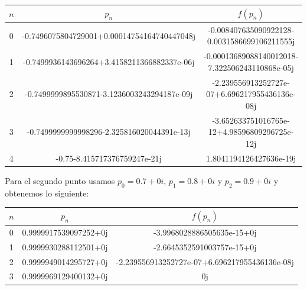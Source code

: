 \documentclass{article}
\begin{document}
\begin{center}
    \begin{tabular}{||c c c||} 
    \hline
    $n$ & $p_{n}$ & $f(p_n)$ \\ [0.5ex] 
    \hline
    0 & -0.7496075804729001+0.00014754164740447048j & -0.008407635090922128-0.0031586699106211555j\\
    \hline
    1 & -0.7499936143696264+3.4158211366882337e-06j & -0.00013689088140012018-7.322506243110868e-05j\\
    \hline
    2 & -0.7499999895530871-3.1236003243294187e-09j & -2.239556913252727e-07+6.696217955436136e-08j \\
    \hline
    3 & -0.7499999999998296-2.325816020044391e-13j & -3.652633751016765e-12+4.98596809296725e-12j \\ 
    \hline
    4 & -0.75-8.415717376759247e-21j & 1.8041194126427636e-19j \\ [1ex]
    \hline
   \end{tabular}
\end{center}

Para el segundo punto usamos $p_0 = 0.7 + 0i$, $p_1 = 0.8 + 0i$ y $p_2 = 0.9 + 0i$ y obtenemos lo siguiente:

\begin{center}
    \begin{tabular}{||c c c||} 
    \hline
    $n$ & $p_{n}$ & $f(p_n)$ \\ [0.5ex] 
    \hline
    0 & 0.9999917539097252+0j & -3.9968028886505635e-15+0j\\
    \hline
    1 & 0.9999930288112501+0j & -2.6645352591003757e-15+0j\\
    \hline
    2 & 0.9999949014295727+0j & -2.239556913252727e-07+6.696217955436136e-08j \\
    \hline
    3 & 0.9999969129400132+0j & 0j \\ [1ex]
    \hline
   \end{tabular}
\end{center}
\end{document}
